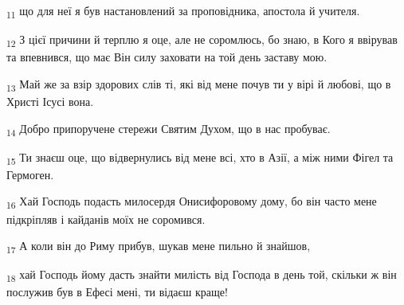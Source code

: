 \begin{tcolorbox}
\textsubscript{11} що для неї я був настановлений за проповідника, апостола й учителя.
\end{tcolorbox}
\begin{tcolorbox}
\textsubscript{12} З цієї причини й терплю я оце, але не соромлюсь, бо знаю, в Кого я ввірував та впевнився, що має Він силу заховати на той день заставу мою.
\end{tcolorbox}
\begin{tcolorbox}
\textsubscript{13} Май же за взір здорових слів ті, які від мене почув ти у вірі й любові, що в Христі Ісусі вона.
\end{tcolorbox}
\begin{tcolorbox}
\textsubscript{14} Добро припоручене стережи Святим Духом, що в нас пробуває.
\end{tcolorbox}
\begin{tcolorbox}
\textsubscript{15} Ти знаєш оце, що відвернулись від мене всі, хто в Азії, а між ними Фігел та Гермоген.
\end{tcolorbox}
\begin{tcolorbox}
\textsubscript{16} Хай Господь подасть милосердя Онисифоровому дому, бо він часто мене підкріпляв і кайданів моїх не соромився.
\end{tcolorbox}
\begin{tcolorbox}
\textsubscript{17} А коли він до Риму прибув, шукав мене пильно й знайшов,
\end{tcolorbox}
\begin{tcolorbox}
\textsubscript{18} хай Господь йому дасть знайти милість від Господа в день той, скільки ж він послужив був в Ефесі мені, ти відаєш краще!
\end{tcolorbox}
